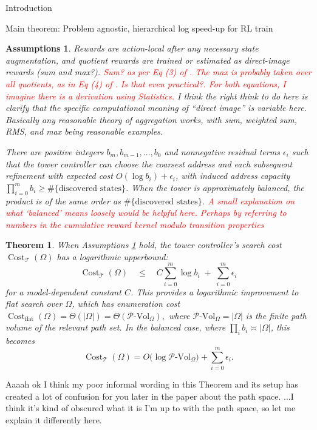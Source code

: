 \documentclass[11pt]{article}
\newtheorem{assumptions}[subsubsection]{Assumptions}
\newtheorem{theorem}[subsubsection]{Theorem}
\newcommand{\PVol}{\mathcal{P}\text{-}\mathrm{Vol}}
\newcommand{\cost}{\operatorname{Cost}}
\begin{document}
\begin{section}{Introduction}
\begin{subsection}{Main theorem: Problem agnostic, hierarchical log speed-up for RL train}
\begin{assumptions}\label{ass: simple ass}
Rewards are action-local after any necessary state augmentation, and quotient rewards are trained or estimated as direct-image rewards (sum and max?). \textcolor{red}{Sum? as per Eq (3) of \cite{HutsebautBuysseHRLSurvey}. The max is probably taken over all quotients, as in Eq (4) of \cite{HutsebautBuysseHRLSurvey}. Is that even practical?. For both equations, I imagine there is a derivation using Statistics.} {\color{blue} I think the right think to do here is clarify that the specific computational meaning of ``direct image'' is variable here. Basically any reasonable theory of aggregation works, with sum, weighted sum, RMS, and max being reasonable examples.}
 

There are positive integers $b_m,b_{m-1},\ldots,b_0$ and nonnegative residual terms $\epsilon_i$ such that the tower controller can choose the coarsest address and each subsequent refinement with expected cost
$O(\log b_i)+\epsilon_i$, with induced address capacity $\prod_{i=0}^{m} b_i \ge \#\{\text{discovered states}\}$.
When the tower is approximately balanced, the product is of the same order as $\#\{\text{discovered states}\}$. \textcolor{red}{A small explanation on what `balanced' means loosely would be helpful here. Perhaps by referring to numbers in the cumulative reward kernel modulo transition properties}
\end{assumptions}


\begin{theorem}\label{theorem: main}
When Assumptions \ref{ass: simple ass} hold, the tower controller's search cost $\cost_{\mathcal{T}}(\Omega)$ has a logarithmic upperbound:
$$
    \cost_{\mathcal{T}}(\Omega)
    \quad\le\quad
    C\sum_{i=0}^{m}\log b_i \;+\; \sum_{i=0}^{m}\epsilon_i
$$
for a model-dependent constant $C$. This provides a logarithmic improvement to flat search over $\Omega$, which has enumeration cost $
    \cost_{\mathrm{flat}}(\Omega)=\Theta(|\Omega|)=\Theta(\PVol_{\Omega}),
$
where $\PVol_{\Omega}=|\Omega|$ is the finite path volume of the relevant path set.  In the balanced case, where $\prod_i b_i\asymp |\Omega|$, this becomes
$$
    \cost_{\mathcal{T}}(\Omega)
    =O\bigl(\log \PVol_{\Omega}\bigr)+\sum_{i=0}^{m}\epsilon_i.
$$
\end{theorem}

{\color{blue} Aaaah ok I think my poor informal wording in this Theorem and its setup has created a lot of confusion for you later in the paper about the path space. ...I think it's kind of obscured what it is I'm up to with the path space, so let me explain it differently here.

}
\end{subsection}
\end{section}
\end{document}
